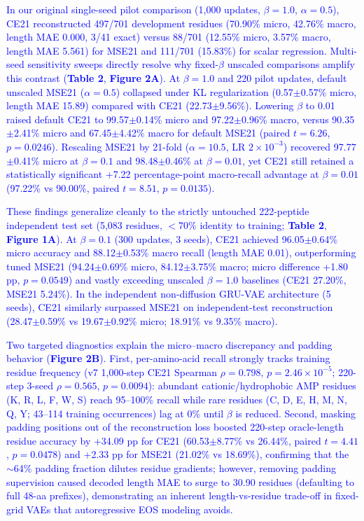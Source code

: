 \documentclass[unnumsec,webpdf,contemporary,large]{oup-authoring-template}
\newcommand{\rev}[1]{\textcolor{blue}{#1}}
\begin{document}
\rev{In our original single-seed pilot comparison (1,000 updates, $\beta=1.0$, $\alpha=0.5$), CE21 reconstructed 497/701 development residues (70.90\% micro, 42.76\% macro, length MAE 0.000, 3/41 exact) versus 88/701 (12.55\% micro, 3.57\% macro, length MAE 5.561) for MSE21 and 111/701 (15.83\%) for scalar regression. Multi-seed sensitivity sweeps directly resolve why fixed-$\beta$ unscaled comparisons amplify this contrast (\textbf{Table 2}, \textbf{Figure 2A}). At $\beta=1.0$ and 220 pilot updates, default unscaled MSE21 ($\alpha=0.5$) collapsed under KL regularization (0.57$\pm$0.57\% micro, length MAE 15.89) compared with CE21 (22.73$\pm$9.56\%). Lowering $\beta$ to 0.01 raised default CE21 to 99.57$\pm$0.14\% micro and 97.22$\pm$0.96\% macro, versus 90.35$\pm$2.41\% micro and 67.45$\pm$4.42\% macro for default MSE21 (paired $t=6.26$, $p=0.0246$). Rescaling MSE21 by 21-fold ($\alpha=10.5$, LR $2\times 10^{-3}$) recovered 97.77$\pm$0.41\% micro at $\beta=0.1$ and 98.48$\pm$0.46\% at $\beta=0.01$, yet CE21 still retained a statistically significant +7.22 percentage-point macro-recall advantage at $\beta=0.01$ (97.22\% vs 90.00\%, paired $t=8.51$, $p=0.0135$).}

\rev{These findings generalize cleanly to the strictly untouched 222-peptide independent test set (5,083 residues, $<$70\% identity to training; \textbf{Table 2}, \textbf{Figure 1A}). At $\beta=0.1$ (300 updates, 3 seeds), CE21 achieved 96.05$\pm$0.64\% micro accuracy and 88.12$\pm$0.53\% macro recall (length MAE 0.01), outperforming tuned MSE21 (94.24$\pm$0.69\% micro, 84.12$\pm$3.75\% macro; micro difference +1.80 pp, $p=0.0549$) and vastly exceeding unscaled $\beta=1.0$ baselines (CE21 27.20\%, MSE21 5.24\%). In the independent non-diffusion GRU-VAE architecture (5 seeds), CE21 similarly surpassed MSE21 on independent-test reconstruction (28.47$\pm$0.59\% vs 19.67$\pm$0.92\% micro; 18.91\% vs 9.35\% macro).}

\rev{Two targeted diagnostics explain the micro--macro discrepancy and padding behavior (\textbf{Figure 2B}). First, per-amino-acid recall strongly tracks training residue frequency (v7 1,000-step CE21 Spearman $\rho=0.798$, $p=2.46\times 10^{-5}$; 220-step 3-seed $\rho=0.565$, $p=0.0094$): abundant cationic/hydrophobic AMP residues (K, R, L, F, W, S) reach 95--100\% recall while rare residues (C, D, E, H, M, N, Q, Y; 43--114 training occurrences) lag at 0\% until $\beta$ is reduced. Second, masking padding positions out of the reconstruction loss boosted 220-step oracle-length residue accuracy by +34.09 pp for CE21 (60.53$\pm$8.77\% vs 26.44\%, paired $t=4.41$, $p=0.0478$) and +2.33 pp for MSE21 (21.02\% vs 18.69\%), confirming that the $\sim$64\% padding fraction dilutes residue gradients; however, removing padding supervision caused decoded length MAE to surge to 30.90 residues (defaulting to full 48-aa prefixes), demonstrating an inherent length-vs-residue trade-off in fixed-grid VAEs that autoregressive EOS modeling avoids.}
\end{document}
